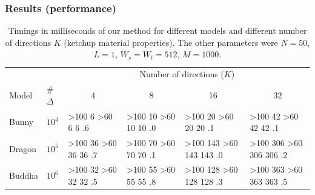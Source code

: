 \documentclass{beamer}
\newcommand\mycolor[1]{
\ifnum#1>100 \cellcolor{redcell}#1%
\else
\ifnum#1>60 \cellcolor{yellowcell}#1%
\else
\cellcolor{greencell}#1%
\fi
\fi
}%
\begin{document}
\begin{frame}
    \frametitle{Results (performance)}
\renewcommand{\arraystretch}{1.8}

\begin{table}[!ht]
\centering
\begin{tabular}{p{3cm}l|l|l|l|l|}
\cline{3-6}
                             &      & \multicolumn{4}{c|}{Number of directions ($K$)}                                          \\ \cline{3-6} 
Model                        & \#$\Delta$& \multicolumn{1}{c|}{4} & \multicolumn{1}{c|}{8} & \multicolumn{1}{c|}{16} & \multicolumn{1}{c|}{32} \\ \hline
\multicolumn{1}{|l|}{Bunny}  & $10^4$ & \mycolor{6}.6                  & \mycolor{10}.0                 & \mycolor{20}.1                  & \mycolor{42}.1                 \\ \hline
\multicolumn{1}{|l|}{Dragon} & $10^5$ & \mycolor{36}.7                 & \mycolor{70}.1                  & \mycolor{143}.0                & \mycolor{306}.2               \\ \hline
\multicolumn{1}{|l|}{Buddha} & $10^6$ & \mycolor{32}.5                 & \mycolor{55}.8                  & \mycolor{128}.3                & \mycolor{363}.5                 \\ \hline
\end{tabular}
\caption{Timings in milliseconds of our method for different models and different number of directions $K$ (ketchup material properties). The other parameters were $N = 50$, $L = 1$, $W_s = W_l = 512$, $M = 1000$.}
\end{table}

\end{frame}
\end{document}
